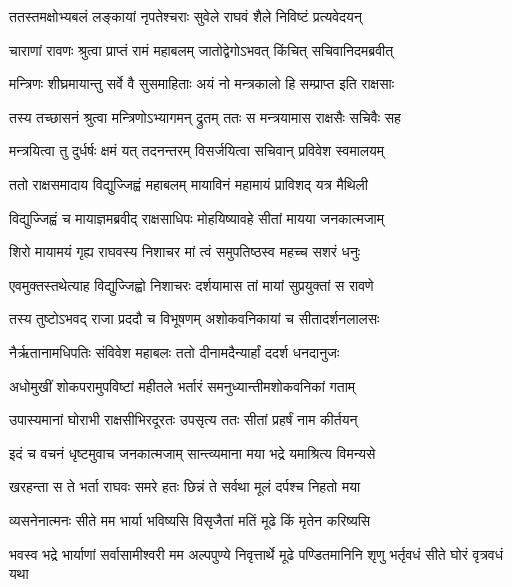 
\twolineshloka
{ततस्तमक्षोभ्यबलं लङ्कायां नृपतेश्चराः}
{सुवेले राघवं शैले निविष्टं प्रत्यवेदयन्} %

\twolineshloka
{चाराणां रावणः श्रुत्वा प्राप्तं रामं महाबलम्}
{जातोद्वेगोऽभवत् किंचित् सचिवानिदमब्रवीत्} %

\twolineshloka
{मन्त्रिणः शीघ्रमायान्तु सर्वे वै सुसमाहिताः}
{अयं नो मन्त्रकालो हि सम्प्राप्त इति राक्षसाः} %

\twolineshloka
{तस्य तच्छासनं श्रुत्वा मन्त्रिणोऽभ्यागमन् द्रुतम्}
{ततः स मन्त्रयामास राक्षसैः सचिवैः सह} %

\twolineshloka
{मन्त्रयित्वा तु दुर्धर्षः क्षमं यत् तदनन्तरम्}
{विसर्जयित्वा सचिवान् प्रविवेश स्वमालयम्} %

\twolineshloka
{ततो राक्षसमादाय विद्युज्जिह्वं महाबलम्}
{मायाविनं महामायं प्राविशद् यत्र मैथिली} %

\twolineshloka
{विद्युज्जिह्वं च मायाज्ञमब्रवीद् राक्षसाधिपः}
{मोहयिष्यावहे सीतां मायया जनकात्मजाम्} %

\twolineshloka
{शिरो मायामयं गृह्य राघवस्य निशाचर}
{मां त्वं समुपतिष्ठस्व महच्च सशरं धनुः} %

\twolineshloka
{एवमुक्तस्तथेत्याह विद्युज्जिह्वो निशाचरः}
{दर्शयामास तां मायां सुप्रयुक्तां स रावणे} %

\twolineshloka
{तस्य तुष्टोऽभवद् राजा प्रददौ च विभूषणम्}
{अशोकवनिकायां च सीतादर्शनलालसः} %

\twolineshloka
{नैर्ऋतानामधिपतिः संविवेश महाबलः}
{ततो दीनामदैन्यार्हां ददर्श धनदानुजः} %

\twolineshloka
{अधोमुखीं शोकपरामुपविष्टां महीतले}
{भर्तारं समनुध्यान्तीमशोकवनिकां गताम्} %

\twolineshloka
{उपास्यमानां घोराभी राक्षसीभिरदूरतः}
{उपसृत्य ततः सीतां प्रहर्षं नाम कीर्तयन्} %

\twolineshloka
{इदं च वचनं धृष्टमुवाच जनकात्मजाम्}
{सान्त्व्यमाना मया भद्रे यमाश्रित्य विमन्यसे} %

\twolineshloka
{खरहन्ता स ते भर्ता राघवः समरे हतः}
{छिन्नं ते सर्वथा मूलं दर्पश्च निहतो मया} %

\twolineshloka
{व्यसनेनात्मनः सीते मम भार्या भविष्यसि}
{विसृजैतां मतिं मूढे किं मृतेन करिष्यसि} %

\threelineshloka
{भवस्व भद्रे भार्याणां सर्वासामीश्वरी मम}
{अल्पपुण्ये निवृत्तार्थे मूढे पण्डितमानिनि}
{शृणु भर्तृवधं सीते घोरं वृत्रवधं यथा} %

